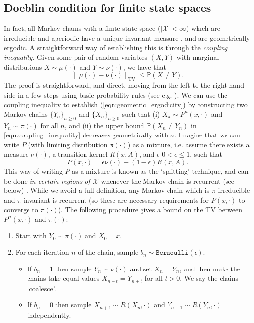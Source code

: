 \documentclass{article}
\newcommand{\X}{\mathcal{X}}
\newcommand{\TV}{\text{TV}}
\begin{document}
\subsection{Doeblin condition for finite state spaces}
In fact, all Markov chains with a finite state space ($|\mathcal{X}| < \infty$) which are irreducible and aperiodic have a unique invariant measure \cite{norris1997markov}, and are geometrically ergodic.  A straightforward way of establishing this is through the \emph{coupling inequality}. Given some pair of random variables $(X,Y)$ with marginal distributions $X \sim \mu(\cdot)$ and $Y \sim \nu(\cdot)$, we have that
\begin{equation}
\|\mu(\cdot) - \nu(\cdot)\|_{\TV} \leq \mathbb{P}(X \neq Y).\label{eqn:coupling_inequality}
\end{equation}
The proof is straightforward, and direct, moving from the left to the right-hand side in a few steps using basic probability rules (see e.g. \cite{roberts2004general}).  We can use the coupling inequality to establish (\ref{eqn:geometric_ergodicity}) by constructing two Markov chains $\{Y_n\}_{n \geq 0}$ and $\{ X_n\}_{n \geq 0}$ such that (i) $X_n \sim P^n(x,\cdot)$ and $Y_n \sim \pi(\cdot)$ for all $n$, and (ii) the upper bound $\mathbb{P}(X_n \neq Y_n)$ in \eqref{eqn:coupling_inequality} decreases geometrically with $n$. 
Imagine that we can write $P$ (with limiting distribution $\pi(\cdot)$) as a mixture, i.e. assume there exists a measure $\nu(\cdot)$, a transition kernel $R(x,A)$, and  $\epsilon$  $0<\epsilon\leq1$, such that
\begin{equation} \label{eqn:doeblin}
P(x,\cdot) = \epsilon \nu(\cdot) + (1 - \epsilon)R(x,A).
\end{equation}
This way of writing $P$ as a mixture is known as the `splitting' technique, and can be done \emph{in certain regions of $\X$} whenever the Markov chain is recurrent (see below) \cite{meyn2009markov}.  While we avoid a full definition, any Markov chain which is $\pi$-irreducible and $\pi$-invariant is recurrent (so these are necessary requirements for $P(x,\cdot)$ to converge to $\pi(\cdot)$).  The following procedure gives a bound on the TV between $P^n(x,\cdot)$ and $\pi(\cdot)$:
\begin{enumerate}
\item Start with $Y_0 \sim \pi(\cdot)$ and $X_0 = x$.
\item For each iteration $n$ of the chain, sample $b_n \sim \texttt{Bernoulli}(\epsilon)$. 
\begin{itemize}
\item If $b_n = 1$ then sample $Y_n \sim \nu(\cdot)$ and set $X_n = Y_n$, and then make the chains take equal values $X_{n+t}=Y_{n+t}$ for all $t>0$. We say the chains  `coalesce'.
\item If $b_n = 0$ then sample $X_{n+1} \sim R(X_n,\cdot)$ and $Y_{n+1} \sim R(Y_{n},\cdot)$ independently.
\end{itemize}
\end{enumerate}
\end{document}
